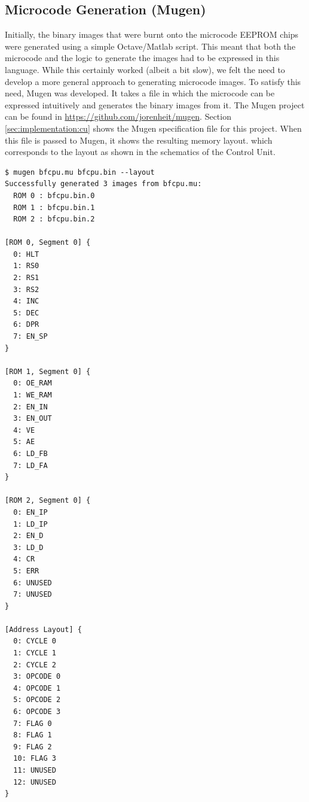 \subsection{Microcode Generation (Mugen)} \label{sec:utilities:mugen}
Initially, the binary images that were burnt onto the microcode EEPROM chips were generated using a simple Octave/Matlab script. This meant that both the microcode and the logic to generate the images had to be expressed in this language. While this certainly worked (albeit a bit slow), we felt the need to develop a more general approach to generating microcode images. To satisfy this need, Mugen was developed. It takes a file in which the microcode can be expressed intuitively and generates the binary images from it. The Mugen project can be found in \url{https://github.com/jorenheit/mugen}. Section \ref{sec:implementation:cu} shows the Mugen specification file for this project. When this file is passed to Mugen, it shows the resulting memory layout. which corresponds to the layout as shown in the schematics of the Control Unit.

\begin{lstlisting}
$ mugen bfcpu.mu bfcpu.bin --layout
Successfully generated 3 images from bfcpu.mu: 
  ROM 0 : bfcpu.bin.0
  ROM 1 : bfcpu.bin.1
  ROM 2 : bfcpu.bin.2

[ROM 0, Segment 0] {
  0: HLT
  1: RS0
  2: RS1
  3: RS2
  4: INC
  5: DEC
  6: DPR
  7: EN_SP
}

[ROM 1, Segment 0] {
  0: OE_RAM
  1: WE_RAM
  2: EN_IN
  3: EN_OUT
  4: VE
  5: AE
  6: LD_FB
  7: LD_FA
}

[ROM 2, Segment 0] {
  0: EN_IP
  1: LD_IP
  2: EN_D
  3: LD_D
  4: CR
  5: ERR
  6: UNUSED
  7: UNUSED
}

[Address Layout] {
  0: CYCLE 0
  1: CYCLE 1
  2: CYCLE 2
  3: OPCODE 0
  4: OPCODE 1
  5: OPCODE 2
  6: OPCODE 3
  7: FLAG 0
  8: FLAG 1
  9: FLAG 2
  10: FLAG 3
  11: UNUSED
  12: UNUSED
}
\end{lstlisting}

